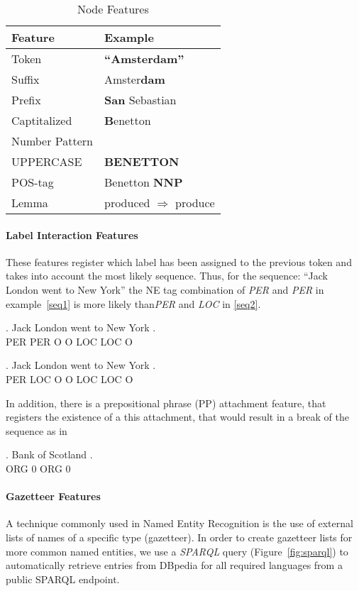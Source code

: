 \documentclass[11pt]{article}
\begin{document}
\begin{table}[h!]
\small
\begin{tabular}{ l l }
\bf Feature & \bf Example \\
\hline
Token &  \textbf{``Amsterdam''}\\
Suffix& Amster\textbf{dam}\\
Prefix&  \textbf{San} Sebastian\\
Captitalized& \textbf{B}enetton\\
Number Pattern & \\
UPPERCASE &  \textbf{BENETTON}\\
POS-tag &  Benetton \textbf{NNP}   \\
Lemma &  produced $\Rightarrow$ produce \\

\end{tabular}
\caption{Node Features}
\label{table:node}
\end{table}

\paragraph*{Label Interaction Features}
These features register which label has been assigned to the previous token and takes into account the most likely sequence. 
Thus, for the sequence: ``Jack London went to New York'' the NE tag combination of \emph{PER} and \emph{PER} in example~\ref{seq1} 
is more likely than\emph{PER} and \emph{LOC} in \ref{seq2}.

\exg. Jack London went to New York .\\
      PER   PER   O    O  LOC LOC  O \\\label{seq1}

\exg. Jack London went to New York . \\ 
      PER  LOC    O    O  LOC LOC O \\\label{seq2}
      
In addition, there is a prepositional phrase (PP) attachment feature, that registers the existence of a this attachment, that would
result in a break of the sequence as in

\exg. Bank of Scotland . \\ 
      ORG   0    ORG   0  \\\label{seq3}
    

\paragraph*{Gazetteer Features}
A technique commonly used in Named Entity Recognition is the use of external lists of names of a specific type (gazetteer). 
In order to create gazetteer lists for more common named entities, we use a \emph{SPARQL} query  (Figure~\ref{fig:sparql}) 
to automatically retrieve entries from DBpedia for all required languages from a public SPARQL endpoint.
\end{document}
